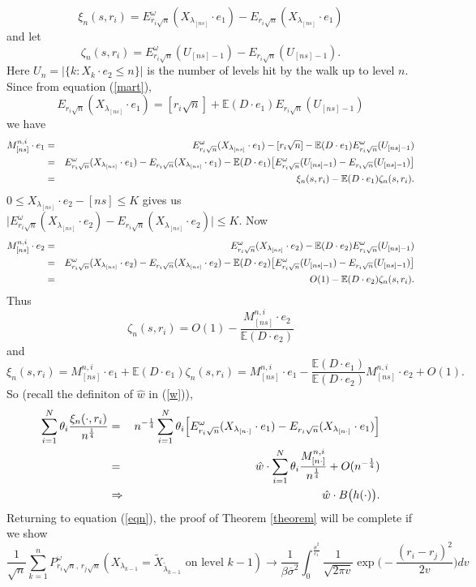 \documentclass[11pt]{amsart}
\begin{document}
\[ \xi_n(s,r_i) = E_{r_i\sqrt{n}}^{\omega}(X_{\lambda_{[ns]}}\cdot e_1) - E_{r_i\sqrt{n}}(X_{\lambda_{[ns]}}\cdot e_1)\]
and let
\[ \zeta_n(s,r_i)= E_{r_i\sqrt{n}}^{\omega}(U_{[ns]-1}) - E_{r_i \sqrt{n}}(U_{[ns]-1}) .\]
Here $U_n=\vert \lbrace k : X_k \cdot e_2 \le n \rbrace \vert $ is the number of levels hit by the walk up to level $n$.
Since  from equation (\ref{mart}),
\[E_{r_i\sqrt{n}}(X_{\lambda_{[ns]}}\cdot e_1)= [r_i \sqrt{n}] +\mathbb{E}(D \cdot e_1)E_{r_i \sqrt{n}}(U_{[ns]-1})\]
 we have
\begin{eqnarray*}
M_{[ns]}^{n,i} \cdot e_1 &= &E_{r_i \sqrt{n}}^{\omega}(X_{\lambda_{[ns]}}\cdot e_1) - [r_i \sqrt{n}]- \mathbb{E}(D \cdot e_1) E_{r_i \sqrt{n}}^{\omega}(U_{[ns]-1}) \\
&=& E_{r_i \sqrt{n}}^{\omega}(X_{\lambda_{[ns]}}\cdot e_1) - E_{r_i \sqrt{n}}(X_{\lambda_{[ns]}}\cdot e_1)- \mathbb{E}(D \cdot e_1) \big{[}E_{r_i \sqrt{n}}^{\omega}(U_{[ns]-1}) -E_{r_i \sqrt{n}}(U_{[ns]-1})\big{]} \\
&=&\xi_n(s,r_i) - \mathbb{E}(D \cdot e_1) \zeta_n(s,r_i).
\end{eqnarray*}
$0\le X_{\lambda_{[ns]}}\cdot e_2 - [ns] \le K$ gives us $\vert E_{r_i \sqrt{n}}^{\omega} (X_{\lambda_{[ns]}} \cdot e_2)-E_{r_i \sqrt{n}} (X_{\lambda_{[ns]}} \cdot e_2)\vert \leq K$. Now
\begin{eqnarray*}
M_{[ns]}^{n,i} \cdot e_2&=& E^{\omega}_{r_i \sqrt{n}}(X_{\lambda_{[ns]}} \cdot e_2)-\mathbb{E}(D \cdot e_2) E_{r_i \sqrt{n}}^{\omega}(U_{[ns]-1}) \\
&=& E^{\omega}_{r_i \sqrt{n}}(X_{\lambda_{[ns]}} \cdot e_2)- E_{r_i \sqrt{n}}(X_{\lambda_{[ns]}} \cdot e_2)- \mathbb{E}(D \cdot e_2)\big{[} E_{r_i \sqrt{n}}^{\omega}(U_{[ns]-1})- E_{r_i \sqrt{n}}(U_{[ns]-1}) \big{]} \\
&=& O(1) - \mathbb{E}(D \cdot e_2) \zeta_n(s,r_i).
\end{eqnarray*}
Thus 
\[\zeta_n(s,r_i)= O(1) - \frac{M_{[ns]}^{n,i} \cdot e_2}{\mathbb{E}(D \cdot e_2)} \]
and
\[ \xi_n(s,r_i)= M_{[ns]}^{n,i} \cdot e_1+\mathbb{E}(D \cdot e_1) \zeta_n(s,r_i)= M_{[ns]}^{n,i} \cdot e_1 - \frac{\mathbb{E}(D \cdot e_1)}{\mathbb{E}(D \cdot e_2)} M_{[ns]}^{n,i} \cdot e_2 +O(1). \]
So (recall the definiton of $\hat{w}$ in (\ref{w})),
\begin{eqnarray*}
 \sum_{i=1}^N \theta_i\frac{\xi_{n}(\cdot,r_i) } {n^{\frac{1}{4}}} &=& n^{- \frac{1}{4}} \sum_{i=1}^N \theta_i \Big{[}E_{r_i \sqrt{n}}^{\omega} (X_{\lambda_{[n\cdot]}} \cdot e_1)-E_{r_i \sqrt{n}} (X_{\lambda_{[n\cdot]}} \cdot e_1)\Big{]}\\
 &=& \hat{w} \cdot \sum_{i=1}^N \theta_i  \frac{M_{[n\cdot]}^{n,i}}{n^{\frac{1}{4}}} +O(n^{-\frac{1}{4}}) \\
&\Rightarrow & \hat{w} \cdot B\big{(}h(\cdot)\big{)}.  
 \end{eqnarray*}
Returning to equation (\ref{eqn}), the proof of Theorem \ref{theorem} will be complete if we show 
\[ \frac{1}{\sqrt{n}} \sum_{k=1}^{n}P^{\omega}_{r_i \sqrt{n},\,r_j \sqrt{n}}
 (X_{\lambda_{k-1}}= \tilde{X}_{\tilde{\lambda}_{k-1}} \mbox{ on level }k-1) \longrightarrow 
 \frac{1}{\beta \overline{\sigma}^2}\int_0^{\frac{\overline{\sigma}^2}{c_1}} \frac{1}{\sqrt{2\pi v}} \exp\big( -\frac{(r_i-r_j)^2}{2v} \big) dv \]
 
\end{document}
